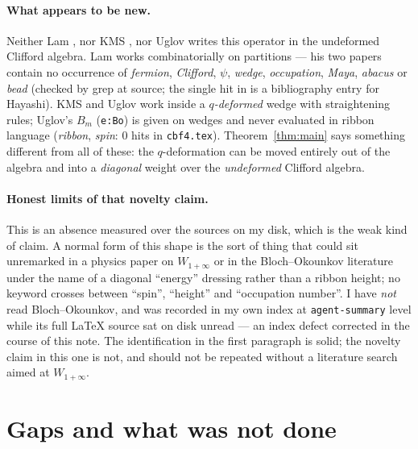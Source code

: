 \documentclass[11pt]{article}
\theoremstyle{definition}
\begin{document}
\paragraph{What appears to be new.}
Neither Lam \cite{Lam0409463,Lam0310250}, nor KMS \cite{KMS}, nor Uglov
\cite{Uglov} writes this operator in the undeformed Clifford algebra.  Lam works
combinatorially on partitions --- his two papers contain no occurrence of
\emph{fermion}, \emph{Clifford}, $\psi$, \emph{wedge}, \emph{occupation},
\emph{Maya}, \emph{abacus} or \emph{bead} (checked by grep at source; the single
hit in \cite{Lam0310250} is a bibliography entry for Hayashi).  KMS and Uglov work
inside a \emph{$q$-deformed} wedge with straightening rules; Uglov's $B_m$
(\texttt{e:Bo}) is given on wedges and never evaluated in ribbon language
(\emph{ribbon}, \emph{spin}: $0$ hits in \texttt{cbf4.tex}).  Theorem~\ref{thm:main}
says something different from all of these: the $q$-deformation can be moved
entirely out of the algebra and into a \emph{diagonal} weight over the
\emph{undeformed} Clifford algebra.

\paragraph{Honest limits of that novelty claim.}
This is an absence measured over the sources on my disk, which is the weak kind of
claim.  A normal form of this shape is the sort of thing that could sit
unremarked in a physics paper on $W_{1+\infty}$ or in the Bloch--Okounkov
literature under the name of a diagonal ``energy'' dressing rather than a ribbon
height; no keyword crosses between ``spin'', ``height'' and ``occupation number''.
I have \emph{not} read Bloch--Okounkov, and \cite{Lam0409463} was recorded in my
own index at \texttt{agent-summary} level while its full \LaTeX{} source sat on
disk unread --- an index defect corrected in the course of this note.  The
identification in the first paragraph is solid; the novelty claim in this one is
not, and should not be repeated without a literature search aimed at
$W_{1+\infty}$.

\section{Gaps and what was not done}
\end{document}
